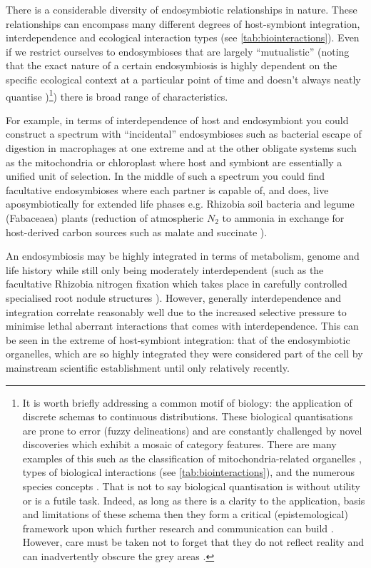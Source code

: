 There is a considerable diversity of endosymbiotic relationships in nature. These relationships can encompass many different
degrees of host-symbiont integration, interdependence and ecological interaction types (see \cref{tab:biointeractions}).
Even if we restrict ourselves to endosymbioses that are largely ``mutualistic'' (noting that the exact nature of
a certain endosymbiosis is highly dependent on the specific ecological context at a particular point of time and doesn't
always neatly quantise \citep{Leung2008})\footnote{It is worth briefly addressing 
    a common motif of biology: the application of discrete schemas to 
    continuous distributions.  These biological quantisations are prone to error (fuzzy delineations)
    and are constantly challenged by novel discoveries which exhibit a mosaic of category features.  
    There are many examples of this such as the classification of 
    mitochondria-related organelles \citep{Maguire2014}, types of biological interactions 
    (see \cref{tab:biointeractions}), and the numerous species concepts \citep{DeQueiroz2007,Boenigk2012}.
    That is not to say biological quantisation is without utility or is a futile task.  Indeed, as long as there is a clarity to 
    the application, basis and limitations of these schema then they form a critical (epistemological) framework upon which further 
    research and communication can build \citep{Boenigk2012}. However, care must be taken not to forget that they do not reflect reality and can inadvertently obscure
the grey areas \citep{Leung2008}.}) there is broad range of characteristics.

For example, in terms of interdependence of host and endosymbiont you could construct a spectrum with ``incidental'' endosymbioses 
such as bacterial escape of digestion in macrophages at one extreme and at the other obligate systems such as the mitochondria or chloroplast 
where host and symbiont are essentially a unified unit of selection.  
In the middle of such a spectrum you could find facultative endosymbioses
where each partner is capable of, and does, live aposymbiotically for extended life phases e.g. Rhizobia soil bacteria and legume (Fabaceaea) plants 
(reduction of atmospheric \(N_{2}\) to ammonia \citep{Hirsch1992} in exchange for host-derived carbon sources such as malate and succinate \citep{Prell2006}).

An endosymbiosis may be highly integrated in terms of metabolism, genome and life history while still only being moderately 
interdependent (such as the facultative Rhizobia nitrogen fixation which takes place
in carefully controlled specialised root nodule structures \citep{Crespi2008}).  However, generally interdependence and integration correlate reasonably
well due to the increased selective pressure to minimise lethal aberrant interactions that comes with interdependence.  This can be seen 
in the extreme of host-symbiont integration: that of the endosymbiotic organelles, which are so highly integrated they were considered part of the cell by
mainstream scientific establishment until only relatively recently.

